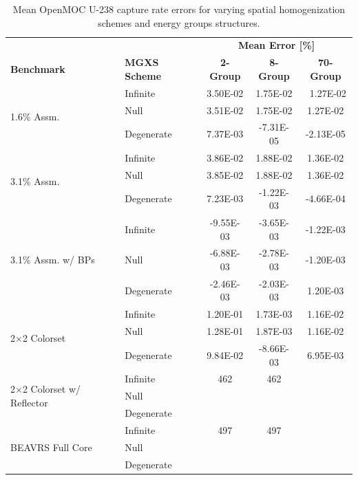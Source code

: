 \begin{table}[h!]
  \centering
  \caption[Mean OpenMOC U-238 capture rate errors]{Mean OpenMOC U-238 capture rate errors for varying spatial homogenization schemes and energy groups structures.}
  \small
  \label{table:chap8-openmoc-mean-capt-rates}
  \vspace{6pt}
  \begin{tabular}{l l c c c}
  \toprule
  \rowcolor{lightgray}
  & & \multicolumn{3}{c}{\cellcolor{lightgray} \textbf{Mean Error [\%]}} \\
  \multirow{-2}{*}{\cellcolor{lightgray} \bf Benchmark} &
  \multirow{-2}{*}{\cellcolor{lightgray} \bf \ac{MGXS} Scheme} &
  {\cellcolor{lightgray} \bf 2-Group} &
  {\cellcolor{lightgray} \bf 8-Group} &
  {\cellcolor{lightgray} \bf 70-Group} \\
  \midrule
\multirow{3}{*}{\parbox{2.5cm}{1.6\% Assm.}} & Infinite & 3.50E-02 & 1.75E-02 &\
 1.27E-02 \\
& Null & 3.51E-02 & 1.75E-02 & 1.27E-02 \\
& Degenerate & 7.37E-03 & -7.31E-05 & -2.13E-05 \\
  \midrule
\multirow{3}{*}{\parbox{2.5cm}{3.1\% Assm.}} & Infinite & 3.86E-02 & 1.88E-02 & 1.36E-02 \\
& Null & 3.85E-02 & 1.88E-02 & 1.36E-02 \\
& Degenerate & 7.23E-03 & -1.22E-03 & -4.66E-04 \\
  \midrule
\multirow{3}{*}{\parbox{2.5cm}{3.1\% Assm. w/ \acp{BP}}} & Infinite & -9.55E-03 & -3.65E-03 & -1.22E-03 \\
& Null & -6.88E-03 & -2.78E-03 & -1.20E-03 \\
& Degenerate & -2.46E-03 & -2.03E-03 & 1.20E-03 \\
  \midrule
  \multirow{3}{*}{\parbox{2.5cm}{2$\times$2 Colorset}} & Infinite & 1.20E-01 & 1.73E-03 & 1.16E-02 \\
& Null & 1.28E-01 & 1.87E-03 & 1.16E-02 \\
& Degenerate & 9.84E-02 & -8.66E-03 & 6.95E-03 \\
  \midrule
  \multirow{3}{*}{\parbox{2.3cm}{2$\times$2 Colorset w/ Reflector}} & Infinite & 462 & 462 & \\
  & Null & & & \\
  & Degenerate & & & \\
  \midrule
  \multirow{3}{*}{\parbox{2cm}{\ac{BEAVRS} Full Core}} & Infinite & 497 & 497 & \\
  & Null & & & \\
  & Degenerate & & & \\
  \bottomrule
\end{tabular}
\end{table}


